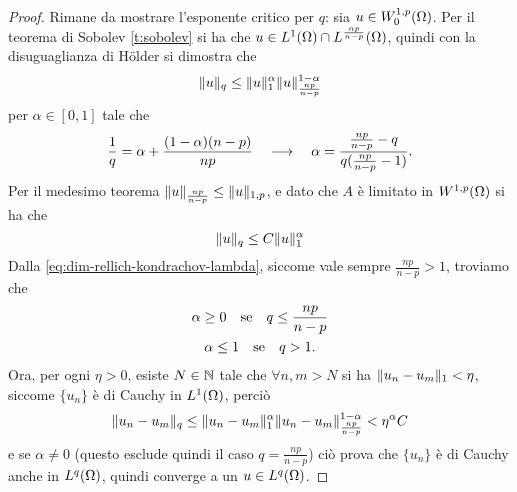 \begin{proof}
    Rimane da mostrare l'esponente critico per $q$: sia $u\in\sobWc[1,p]{\Omega}$.
    Per il teorema di Sobolev \ref{t:sobolev} si ha che $u\in\leb[1]{\Omega}\cap\leb[\frac{np}{n-p}]{\Omega}$, quindi con la disuguaglianza di Hölder si dimostra che
    \begin{equation}
        \norm{u}_q\le
        \norm{u}_1^\alpha\norm{u}_\frac{np}{n-p}^{1-\alpha}
    \end{equation}
    per $\alpha\in[0,1]$ tale che
    \begin{equation}
        \frac1{q}=\alpha+\frac{(1-\alpha)(n-p)}{np}
        \qqq
        \alpha=\frac{\frac{np}{n-p}-q}{q(\frac{np}{n-p}-1)}.
        \label{eq:dim-rellich-kondrachov-lambda}
    \end{equation}
    Per il medesimo teorema $\norm{u}_\frac{np}{n-p}\le\norm{u}_{1,p}$, e dato che $A$ è limitato in $\sobW[1,p]{\Omega}$ si ha che
    \begin{equation}
        \norm{u}_q\le C\norm{u}_1^\alpha
    \end{equation}
    Dalla \eqref{eq:dim-rellich-kondrachov-lambda}, siccome vale sempre $\frac{np}{n-p}>1$, troviamo che
    \begin{equation}
        \begin{gathered}
            \alpha\ge 0
            \qtext{se}
            q\le\frac{np}{n-p}\\
            \alpha\le 1
            \qtext{se}
            q>1.
        \end{gathered}
    \end{equation}
    Ora, per ogni $\eta>0$, esiste $N\in\N$ tale che $\forall n,m>N$ si ha $\norm{u_n-u_m}_1<\eta$, siccome $\{u_n\}$ è di Cauchy in $\leb[1]{\Omega}$, perciò
    \begin{equation}
        \norm{u_n-u_m}_q\le
        \norm{u_n-u_m}_1^\alpha\norm{u_n-u_m}_\frac{np}{n-p}^{1-\alpha}<\eta^\alpha C
    \end{equation}
    e se $\alpha\ne 0$ (questo esclude quindi il caso $q=\frac{np}{n-p}$) ciò prova che $\{u_n\}$ è di Cauchy anche in $\leb[q]{\Omega}$, quindi converge a un $u\in\leb[q]{\Omega}$.
\end{proof}

